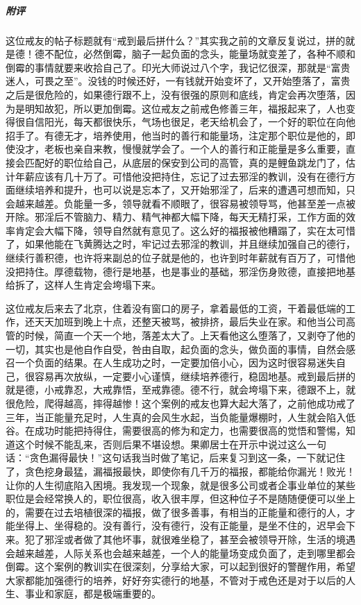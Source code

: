 \begin{case}
    \subparagraph{附评} 这位戒友的帖子标题就有“戒到最后拼什么？”其实我之前的文章反复说过，拼的就是德！德不配位，必然倒霉，脑子一起负面的念头，能量场就变差了，各种不顺和倒霉的事情就要来收拾自己了。印光大师说过八个字，我记忆很深，那就是“富贵迷人，可畏之至”。没钱的时候还好，一有钱就开始变坏了，又开始堕落了，富贵之后是很危险的，如果德行跟不上，没有很强的原则和底线，肯定会再次堕落，因为是明知故犯，所以更加倒霉。这位戒友之前戒色修善三年，福报起来了，人也变得很自信阳光，每天都很快乐，气场也很足，老天给机会了，一个好的职位在向他招手了。有德无才，培养使用，他当时的善行和能量场，注定那个职位是他的，即使没才，老板也亲自来教，慢慢就学会了。一个人的善行和正能量是多么重要，直接会匹配好的职位给自己，从底层的保安到公司的高管，真的是鲤鱼跳龙门了，估计年薪应该有几十万了。可惜他没把持住，忘记了过去邪淫的教训，没有在德行方面继续培养和提升，也可以说是忘本了，又开始邪淫了，后来的遭遇可想而知，只会越来越差。负能量一多，领导就看不顺眼了，很容易被领导骂，他甚至差一点被开除。邪淫后不管脑力、精力、精气神都大幅下降，每天无精打采，工作方面的效率肯定会大幅下降，领导自然就有意见了。这么好的福报被他糟蹋了，实在太可惜了，如果他能在飞黄腾达之时，牢记过去邪淫的教训，并且继续加强自己的德行，继续行善积德，也许将来副总的位子就是他的，也许到时年薪就有百万了，可惜他没把持住。厚德载物，德行是地基，也是事业的基础，邪淫伤身败德，直接把地基给拆了，这样人生肯定会垮塌下来。

    这位戒友后来去了北京，住着没有窗口的房子，拿着最低的工资，干着最低端的工作，还天天加班到晚上十点，还整天被骂，被排挤，最后失业在家。和他当公司高管的时候，简直一个天一个地，落差太大了。上天看他这么堕落了，又剥夺了他的一切，其实也是他自作自受，咎由自取，起负面的念头，做负面的事情，自然会感召一个负面的结果。在人生成功之时，一定要加倍小心，因为这时很容易迷失自己，很容易再次放纵，一定要小心谨慎，继续培养德行，稳固地基。戒到最后拼的就是德，小戒靠忍，大戒靠悟，至戒靠德。德不行，就会垮塌下来，德跟不上，就很危险，爬得越高，摔得越惨！这个案例的戒友也算大起大落了，之前他成功戒了三年，当正能量充足时，人生真的会风生水起，当负能量爆棚时，人生就会陷入低谷。在成功时能把持得住，需要很高的修为和定力，也需要很高的觉悟和警惕，知道这个时候不能乱来，否则后果不堪设想。果卿居士在开示中说过这么一句话：“贪色漏得最快！”这句话我当时做了笔记，后来复习到这一条，一下就记住了，贪色挖身最猛，漏福报最快，即使你有几千万的福报，都能给你漏光！败光！让你的人生彻底陷入困境。我发现一个现象，就是很多公司或者企事业单位的某些职位是会经常换人的，职位很高，收入很丰厚，但这种位子不是随随便便可以坐上的，需要在过去培植很深的福报，做了很多善事，有相当的正能量和德行的人，才能坐得上、坐得稳的。没有善行，没有德行，没有正能量，是坐不住的，迟早会下来。犯了邪淫或者做了其他坏事，就很难坐稳了，甚至会被领导开除，生活的境遇会越来越差，人际关系也会越来越差，一个人的能量场变成负面了，走到哪里都会倒霉。这个案例的教训实在很深刻，分享给大家，可以起到很好的警醒作用，希望大家都能加强德行的培养，好好夯实德行的地基，不管对于戒色还是对于以后的人生、事业和家庭，都是极端重要的。


\end{case}
